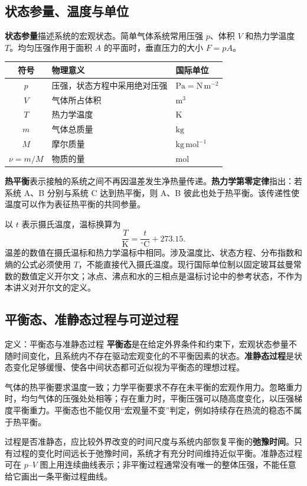 \documentclass[UTF8,fontset=none,zihao=-4,a4paper]{ctexart}
\newcommand{\term}[1]{\textbf{#1}}
\begin{document}
\subsection{状态参量、温度与单位}
\term{状态参量}描述系统的宏观状态。简单气体系统常用压强 $p$、体积 $V$ 和热力学温度 $T$。均匀压强作用于面积 $A$ 的平面时，垂直压力的大小 $F=pA$。
\begin{center}
\begin{tabularx}{\linewidth}{c Y l}
\toprule
符号 & 物理意义 & 国际单位\\
\midrule
$p$ & 压强，状态方程中采用绝对压强 & $\mathrm{Pa}=\mathrm{N\,m^{-2}}$\\
$V$ & 气体所占体积 & $\mathrm{m^3}$\\
$T$ & 热力学温度 & $\mathrm{K}$\\
$m$ & 气体总质量 & $\mathrm{kg}$\\
$M$ & 摩尔质量 & $\mathrm{kg\,mol^{-1}}$\\
$\nu=m/M$ & 物质的量 & $\mathrm{mol}$\\
\bottomrule
\end{tabularx}
\end{center}
\term{热平衡}表示接触的系统之间不再因温差发生净热量传递。\term{热力学第零定律}指出：若系统 A、B 分别与系统 C 达到热平衡，则 A、B 彼此也处于热平衡。该传递性使温度可以作为表征热平衡的共同参量。

以 $t$ 表示摄氏温度，温标换算为
\[
\frac{T}{\mathrm{K}}=\frac{t}{{}^\circ\mathrm{C}}+273.15.
\]
温差的数值在摄氏温标和热力学温标中相同。涉及温度比、状态方程、分布指数和熵的公式必须使用 $T$，不能直接代入摄氏温度。现行国际单位制以固定玻耳兹曼常数的数值定义开尔文；冰点、沸点和水的三相点是温标讨论中的参考状态，不作为本讲义对开尔文的定义。

\subsection{平衡态、准静态过程与可逆过程}
\begin{infobox}{定义：平衡态与准静态过程}
\term{平衡态}是在给定外界条件和约束下，宏观状态参量不随时间变化，且系统内不存在驱动宏观变化的不平衡因素的状态。\term{准静态过程}是状态变化足够缓慢、使各中间状态都可近似视为平衡态的理想过程。
\end{infobox}
气体的热平衡要求温度一致；力学平衡要求不存在未平衡的宏观作用力。忽略重力时，均匀气体的压强处处相等；存在重力时，平衡压强可以随高度变化，以压强梯度平衡重力。平衡态也不能仅用“宏观量不变”判定，例如持续存在热流的稳态不属于热平衡。

过程是否准静态，应比较外界改变的时间尺度与系统内部恢复平衡的\term{弛豫时间}。只有过程的变化时间远长于弛豫时间，系统才有充分时间维持近似平衡。准静态过程可在 $p$--$V$ 图上用连续曲线表示；非平衡过程通常没有唯一的整体压强，不能任意给它画出一条平衡过程曲线。
\end{document}
